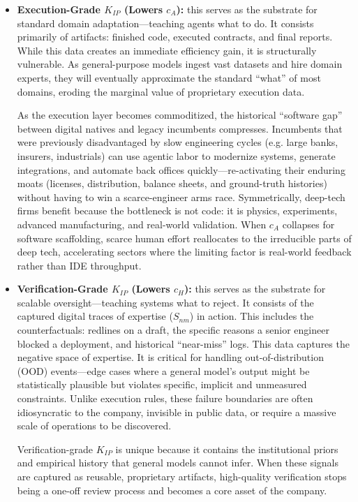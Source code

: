 \documentclass[12pt, letter]{article}
\begin{document}
\begin{itemize}
\item \textbf{Execution-Grade $K_{IP}$ (Lowers $c_A$):} this serves as the substrate for standard domain adaptation—teaching agents what to do. It consists primarily of artifacts: finished code, executed contracts, and final reports. While this data creates an immediate efficiency gain, it is structurally vulnerable. As general-purpose models ingest vast datasets and hire domain experts, they will eventually approximate the standard ``what'' of most domains, eroding the marginal value of proprietary execution data.

As the execution layer becomes commoditized, the historical ``software gap'' between digital natives and legacy incumbents compresses. Incumbents that were previously disadvantaged by slow engineering cycles (e.g. large banks, insurers, industrials) can use agentic labor to modernize systems, generate integrations, and automate back offices quickly—re-activating their enduring moats (licenses, distribution, balance sheets, and ground-truth histories) without having to win a scarce-engineer arms race. Symmetrically, deep-tech firms benefit because the bottleneck is not code: it is physics, experiments, advanced manufacturing, and real-world validation. When $c_A$ collapses for software scaffolding, scarce human effort reallocates to the irreducible parts of deep tech, accelerating sectors where the limiting factor is real-world feedback rather than IDE throughput.

\item \textbf{Verification-Grade $K_{IP}$ (Lowers $c_H$):} this serves as the substrate for scalable oversight—teaching systems what to reject. It consists of the captured digital traces of expertise ($S_{nm}$) in action. This includes the counterfactuals: redlines on a draft, the specific reasons a senior engineer blocked a deployment, and historical ``near-miss'' logs. This data captures the negative space of expertise. It is critical for handling out-of-distribution (OOD) events—edge cases where a general model’s output might be statistically plausible but violates specific, implicit and unmeasured constraints. Unlike execution rules, these failure boundaries are often idiosyncratic to the company, invisible in public data, or require a massive scale of operations to be discovered.

Verification-grade $K_{IP}$ is unique because it contains the institutional priors and empirical history that general models cannot infer. When these signals are captured as reusable, proprietary artifacts, high-quality verification stops being a one-off review process and becomes a core asset of the company.


\end{itemize}
\end{document}
